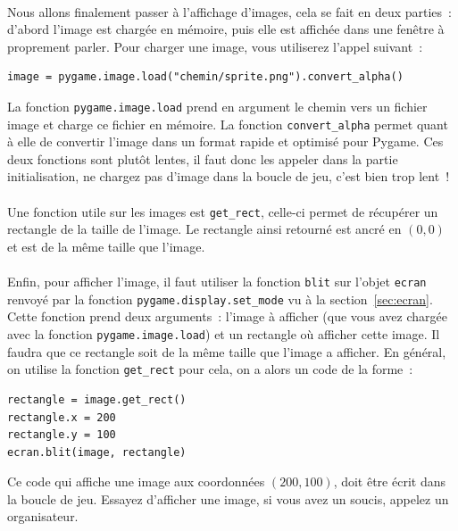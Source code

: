 \paragraph{}
Nous allons finalement passer à l'affichage d'images, cela se fait en deux parties~: d'abord l'image est chargée en mémoire, puis elle est affichée dans une fenêtre à proprement parler.
Pour charger une image, vous utiliserez l'appel suivant~:
\begin{verbatim}
image = pygame.image.load("chemin/sprite.png").convert_alpha()
\end{verbatim}
La fonction \texttt{pygame.image.load} prend en argument le chemin vers un fichier image et charge ce fichier en mémoire.
La fonction \texttt{convert\_alpha} permet quant à elle de convertir l'image dans un format rapide et optimisé pour Pygame.
Ces deux fonctions sont plutôt lentes, il faut donc les appeler dans la partie initialisation, ne chargez pas d'image dans la boucle de jeu, c'est bien trop lent~!

\paragraph{}
Une fonction utile sur les images est \texttt{get\_rect}, celle-ci permet de récupérer un rectangle de la taille de l'image.
Le rectangle ainsi retourné est ancré en \((0, 0)\) et est de la même taille que l'image.

\paragraph{}
Enfin, pour afficher l'image, il faut utiliser la fonction \texttt{blit} sur l'objet \texttt{ecran} renvoyé par la fonction \texttt{pygame.display.set\_mode} vu à la section~\ref{sec:ecran}.
Cette fonction prend deux arguments~: l'image à afficher (que vous avez chargée avec la fonction \texttt{pygame.image.load}) et un rectangle où afficher cette image.
Il faudra que ce rectangle soit de la même taille que l'image a afficher.
En général, on utilise la fonction \texttt{get\_rect} pour cela, on a alors un code de la forme~:
\begin{verbatim}
rectangle = image.get_rect()
rectangle.x = 200
rectangle.y = 100
ecran.blit(image, rectangle)
\end{verbatim}
Ce code qui affiche une image aux coordonnées \((200, 100)\), doit être écrit dans la boucle de jeu.
Essayez d'afficher une image, si vous avez un soucis, appelez un organisateur.

